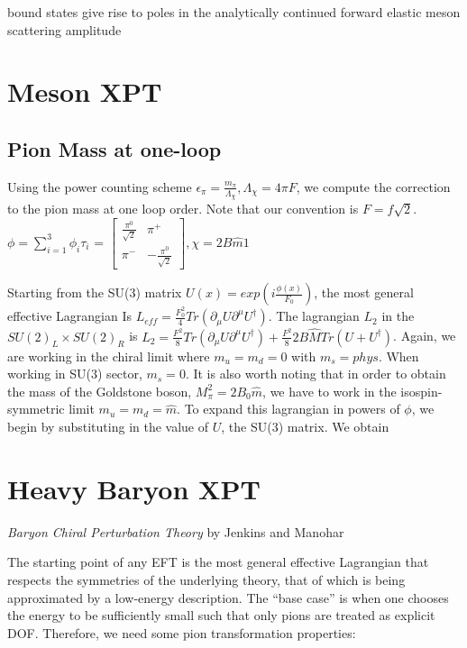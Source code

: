 \documentclass[12pt,tightenlines, raggedbottom, prd, notitlepage]{revtex4-1}
\begin{document}
bound states give rise to poles in the analytically continued forward elastic meson scattering amplitude 

\section*{Meson XPT}

\subsection*{Pion Mass at one-loop}
Using the power counting scheme $\epsilon_\pi = \frac{m_\pi}{\Lambda_\chi} , \Lambda_\chi = 4\pi F $, we compute 
the correction to the pion mass at one loop order. Note that our convention is $F=f\sqrt{2}$.
$\phi= \sum_{i=1}^{3}\phi_i\tau_i$ = $\begin{bmatrix}\frac{\pi^0}{\sqrt{2}} & \pi^+ \\ \pi^- & -\frac{\pi^0}{\sqrt{2}}\end{bmatrix},
 \chi = 2B\hat{m}1$

Starting from the SU(3) matrix $U(x) = exp(i\frac{\phi(x)}{F_0})$, the most general effective Lagrangian Is
$L_{eff} = \frac{F_0^2}{4} Tr(\partial_\mu U \partial^\mu U^\dagger)$. The lagrangian $L_2$ in the 
$SU(2)_L \times SU(2)_R$ is 
$ L_2 = \frac{F^2}{8}Tr(\partial_\mu U \partial^\mu U^\dagger) + \frac{F^2}{8}2B\hat{M}Tr(U + U^\dagger)$. Again,
we are working in the chiral limit where $m_u = m_d = 0$ with $m_s = phys$. When working in SU(3) sector, $m_s = 0$. It is 
also worth noting that in order to obtain the mass of the Goldstone boson, $M_\pi^2 = 2B_0\hat{m}$, we have to work in the 
isospin-symmetric limit $m_u = m_d = \hat{m}$.  
To expand this lagrangian in powers of $\phi$, we begin by substituting in the value of $U$, the SU(3) matrix. 
We obtain 



\section*{Heavy Baryon XPT}
\textit{Baryon Chiral Perturbation Theory} by Jenkins and Manohar

The starting point of any EFT is the most general effective Lagrangian that respects the symmetries of the underlying theory,
that of which is being approximated by a low-energy description. The ``base case'' is when one chooses the energy to 
be sufficiently small such that only pions are treated as explicit DOF. Therefore, we need some pion transformation properties:
\end{document}
